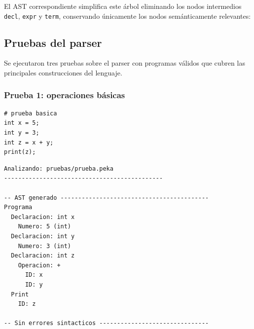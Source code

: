 \documentclass[12pt]{article}
\begin{document}
\noindent
El AST correspondiente simplifica este árbol eliminando los nodos
intermedios \texttt{decl}, \texttt{expr} y \texttt{term}, conservando
únicamente los nodos semánticamente relevantes:

\vspace{0.3cm}
\begin{center}
\shorthandoff{<>}
\shorthandon{<>}
\end{center}

\subsection{Pruebas del parser}

Se ejecutaron tres pruebas sobre el parser con programas válidos que
cubren las principales construcciones del lenguaje.

\subsubsection{Prueba 1: operaciones básicas}

\begin{lstlisting}[caption={prueba.peka}]
# prueba basica
int x = 5;
int y = 3;
int z = x + y;
print(z);
\end{lstlisting}

\begin{lstlisting}[caption={AST generado -- prueba.peka}]
Analizando: pruebas/prueba.peka
---------------------------------------------

-- AST generado ------------------------------------------
Programa
  Declaracion: int x
    Numero: 5 (int)
  Declaracion: int y
    Numero: 3 (int)
  Declaracion: int z
    Operacion: +
      ID: x
      ID: y
  Print
    ID: z

-- Sin errores sintacticos -------------------------------
\end{lstlisting}
\end{document}
